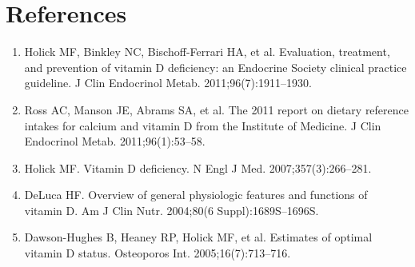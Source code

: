 \section*{References}
\begin{enumerate}
  \item Holick MF, Binkley NC, Bischoff-Ferrari HA, et al. Evaluation, treatment, and prevention of vitamin D deficiency: an Endocrine Society clinical practice guideline. J Clin Endocrinol Metab. 2011;96(7):1911--1930.
  \item Ross AC, Manson JE, Abrams SA, et al. The 2011 report on dietary reference intakes for calcium and vitamin D from the Institute of Medicine. J Clin Endocrinol Metab. 2011;96(1):53--58.
  \item Holick MF. Vitamin D deficiency. N Engl J Med. 2007;357(3):266--281.
  \item DeLuca HF. Overview of general physiologic features and functions of vitamin D. Am J Clin Nutr. 2004;80(6 Suppl):1689S--1696S.
  \item Dawson-Hughes B, Heaney RP, Holick MF, et al. Estimates of optimal vitamin D status. Osteoporos Int. 2005;16(7):713--716.
\end{enumerate}
\clearpage
